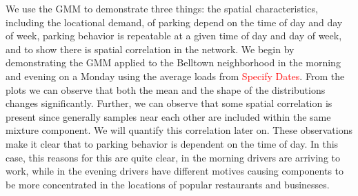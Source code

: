 \documentclass{article}
\begin{document}
\indent
We use the GMM to demonstrate three things: the spatial characteristics, including the locational demand, of parking depend on the time of day and day of week, parking behavior is repeatable at a given time of day and day of week, and to show there is spatial correlation in the network.
\newline
\indent
We begin by demonstrating the GMM applied to the Belltown neighborhood in the morning and evening on a Monday using the average loads from \textcolor{red}{Specify Dates}. From the plots we can observe that both the mean and the shape of the distributions changes significantly. Further, we can observe that some spatial correlation is present since generally samples near each other are included within the same mixture component. We will quantify this correlation later on. These observations make it clear that to parking behavior is dependent on the time of day. In this case, this reasons for this are quite clear, in the morning drivers are arriving to work, while in the evening drivers have different motives causing components to be more concentrated in the locations of popular restaurants and businesses.
\end{document}
